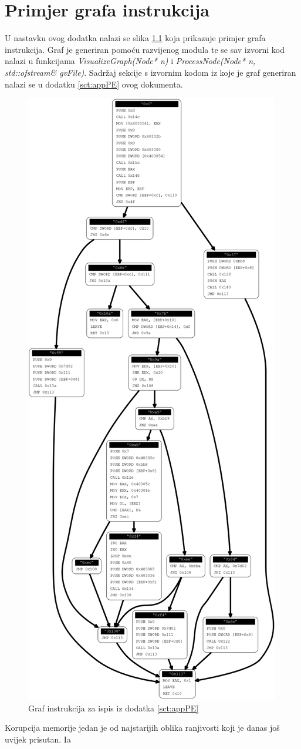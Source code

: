 \documentclass[times, utf8, diplomski, numeric]{fer}
\begin{document}
\chapter{Primjer grafa instrukcija}
\label{sct:appGraph}

U nastavku ovog dodatka nalazi se slika \ref{fig:appGraphInstr} 
koja prikazuje primjer grafa instrukcija. Graf je generiran
pomoću razvijenog modula te se sav izvorni kod nalazi u
funkcijama \emph{VisualizeGraph(Node* n)} i
\emph{ProcessNode(Node* n, std::ofstream\& gvFile)}. Sadržaj
sekcije s izvornim kodom iz koje je graf generiran nalazi se u
dodatku \ref{sct:appPE} ovog dokumenta.

\begin{figure}[htb]
\centering
\setlength\fboxsep{0pt}
\setlength\fboxrule{0.5pt}
\includegraphics[width=\textwidth, height=\textheight]{slike/AD_CM1_graph}
\caption{Graf instrukcija za ispis iz dodatka \ref{sct:appPE}}
\label{fig:appGraphInstr} 
\end{figure}
\clearpage

\begin{sazetak}
Korupcija memorije jedan je od najstarijih oblika ranjivosti koji
je danas još uvijek prisutan. Ia
\end{sazetak}
\end{document}
